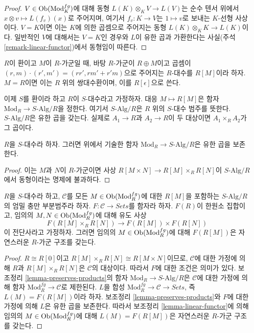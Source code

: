 \begin{proof}
$V \in \mathop{\mathrm{Ob}}\nolimits(\text{Mod}^{fg}_K)$에 대해 동형
$L(K) \otimes_K V \to L(V)$는 순수 텐서 위에서
$x \otimes v \mapsto L(f_v)(x)$로 주어지며, 여기서
$f_v: K \to V$는 $1 \mapsto v$로 보내는 $K$-선형 사상이다.
$V = K$이면 이는
$K$에 의한 곱셈으로 주어지는 동형 $L(K) \otimes_K K \to L(K)$이다.
일반적인 $V$에 대해서는 $V = K$인 경우와 $L$이 유한 곱과
가환한다는 사실(주석 \ref{remark-linear-functor})에서 동형임이 따른다.
\end{proof}

\noindent
$R$이 환이고 $M$이 $R$-가군일 때, 바탕 $R$-가군이
$R \oplus M$이고 곱셈이
$(r, m) \cdot (r', m') = (rr', rm' + r'm)$으로 주어지는
$R$-대수를 $R[M]$이라 하자. $M = R$이면 이는 $R$ 위의
쌍대수환이며, 이를 $R[\epsilon]$으로 쓴다.

\medskip\noindent
이제 $S$를 환이라 하고 $R$이 $S$-대수라고 가정하자.
대응 $M \mapsto R[M]$은 함자
$\text{Mod}_R \to S\text{-Alg}/R$을 정한다. 여기서
$S\text{-Alg}/R$은 $R$ 위의 $S$-대수 범주를 뜻한다.
$S\text{-Alg}/R$은 유한 곱을 갖는다. 실제로
$A_1 \to R$과 $A_2 \to R$이 두 대상이면
$A_1 \times_R A_2$가 그 곱이다.

\begin{lemma}
\label{lemma-preserves-products}
$R$을 $S$-대수라 하자. 그러면 위에서 기술한 함자
$\text{Mod}_R \to S\text{-Alg}/R$은 유한 곱을 보존한다.
\end{lemma}

\begin{proof}
이는 $M$과 $N$이 $R$-가군이면 사상
$R[M \times N] \to R[M] \times_R R[N]$이
$S\text{-Alg}/R$에서 동형이라는 명제에 불과하다.
\end{proof}

\begin{lemma}
\label{lemma-tangent-space-functor}
$R$을 $S$-대수라 하고, $\mathcal{C}$를 모든
$M \in \mathop{\mathrm{Ob}}\nolimits(\text{Mod}^{fg}_R)$에 대한 $R[M]$을 포함하는
$S\text{-Alg}/R$의 엄밀 충만 부분범주라 하자.
$F: \mathcal{C} \to \textit{Sets}$를 함자라 하자.
$F(R)$이 한원소 집합이고, 임의의
$M, N \in \mathop{\mathrm{Ob}}\nolimits(\text{Mod}^{fg}_R)$에 대해 유도 사상
$$
F(R[M] \times_R R[N]) \to F(R[M]) \times F(R[N])
$$
이 전단사라고 가정하자. 그러면 임의의
$M \in \mathop{\mathrm{Ob}}\nolimits(\text{Mod}^{fg}_R)$에 대해 $F(R[M])$은 자연스러운
$R$-가군 구조를 갖는다.
\end{lemma}

\begin{proof}
$R \cong R[0]$이고
$R[M] \times_R R[N] \cong R[M \times N]$이므로,
$\mathcal{C}$에 대한 가정에 의해 $R$과
$R[M] \times_R R[N]$은 $\mathcal{C}$의 대상이다.
따라서 $F$에 대한 조건은 의미가 있다.
보조정리 \ref{lemma-preserves-products}의 함자
$\text{Mod}_R \to S\text{-Alg}/R$은 $\mathcal{C}$에 대한
가정에 의해 함자 $\text{Mod}^{fg}_R \to \mathcal{C}$로 제한된다.
$L$을 합성 $\text{Mod}^{fg}_R \to \mathcal{C} \to \textit{Sets}$,
즉 $L(M) = F(R[M])$이라 하자.
보조정리 \ref{lemma-preserves-products}와 $F$에 대한 가정에 의해
$L$은 유한 곱을 보존한다. 따라서 보조정리
\ref{lemma-linear-functor}에 의해 임의의
$M \in \mathop{\mathrm{Ob}}\nolimits(\text{Mod}^{fg}_R)$에 대해
$L(M) = F(R[M])$은 자연스러운 $R$-가군 구조를 갖는다.
\end{proof}

